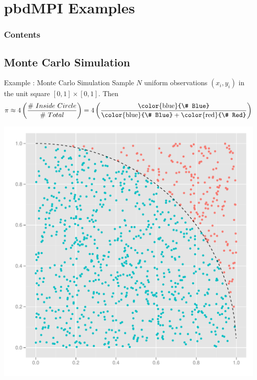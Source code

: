 \section[pbdMPI Eg's]{pbdMPI Examples}

\hidenum
\begin{frame}[noframenumbering]
\frametitle{Contents}
 \tableofcontents[currentsection,hideothersubsections,sectionstyle=show/hide]
\end{frame}
\shownum

\subsection{Monte Carlo Simulation}

\begin{frame}[shrink]
  \begin{block}{Example \countex :  Monte Carlo Simulation}\pause
  Sample $N$ uniform observations $(x_i, y_i)$ in the unit square $[0, 1]\times [0,1]$.  Then
\begin{equation*}
\pi \approx 4\left(\frac{\#\ Inside\ Circle}{\#\ Total}\right) = 4\left(\frac{\text{\color{blue}{\# Blue}}}{\text{\color{blue}{\# Blue}}+\text{\color{red}{\# Red}}}\right)
\label{eqn:pi}
\end{equation*}
  \begin{center}
   \includegraphics[scale=.25]{pics/pi} 
  \end{center}
  \end{block}
\end{frame}


